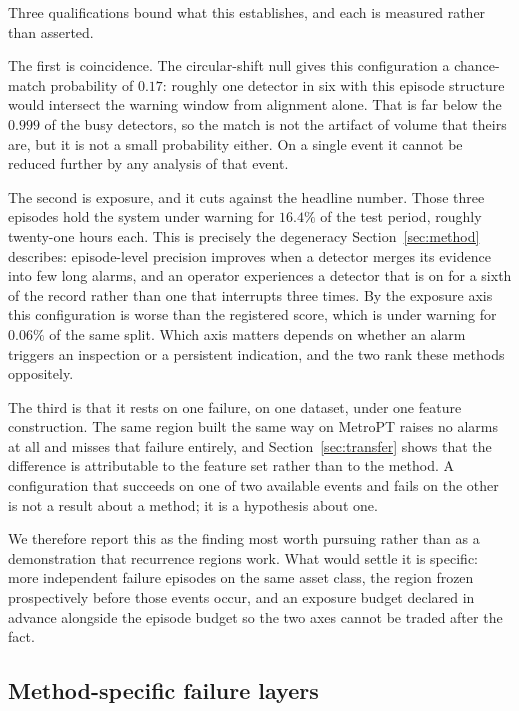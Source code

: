 Three qualifications bound what this establishes, and each is measured rather than asserted.

The first is coincidence. The circular-shift null gives this configuration a chance-match probability of \(0.17\): roughly one detector in six with this episode structure would intersect the warning window from alignment alone. That is far below the \(0.999\) of the busy detectors, so the match is not the artifact of volume that theirs are, but it is not a small probability either. On a single event it cannot be reduced further by any analysis of that event.

The second is exposure, and it cuts against the headline number. Those three episodes hold the system under warning for \(16.4\%\) of the test period, roughly twenty-one hours each. This is precisely the degeneracy Section~\ref{sec:method} describes: episode-level precision improves when a detector merges its evidence into few long alarms, and an operator experiences a detector that is on for a sixth of the record rather than one that interrupts three times. By the exposure axis this configuration is worse than the registered score, which is under warning for \(0.06\%\) of the same split. Which axis matters depends on whether an alarm triggers an inspection or a persistent indication, and the two rank these methods oppositely.

The third is that it rests on one failure, on one dataset, under one feature construction. The same region built the same way on MetroPT raises no alarms at all and misses that failure entirely, and Section~\ref{sec:transfer} shows that the difference is attributable to the feature set rather than to the method. A configuration that succeeds on one of two available events and fails on the other is not a result about a method; it is a hypothesis about one.

We therefore report this as the finding most worth pursuing rather than as a demonstration that recurrence regions work. What would settle it is specific: more independent failure episodes on the same asset class, the region frozen prospectively before those events occur, and an exposure budget declared in advance alongside the episode budget so the two axes cannot be traded after the fact.

\subsection{Method-specific failure layers}
\label{sec:root-cause}

